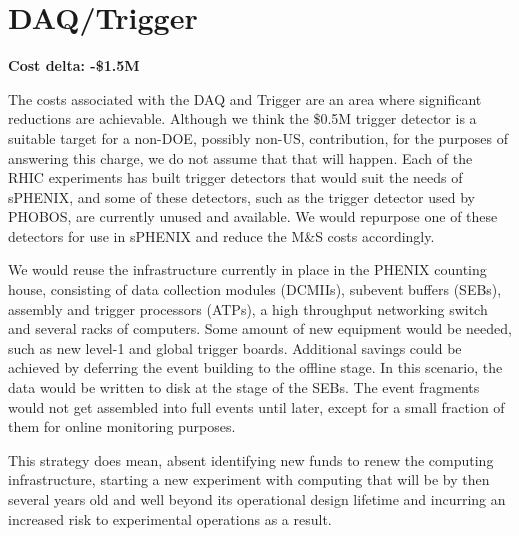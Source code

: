 \section{DAQ/Trigger}
\label{daq}

\textbf{Cost delta: -\$1.5M}

The costs associated with the DAQ and Trigger are an area where
significant reductions are achievable.  Although we think the
\$0.5M trigger detector is a suitable target for a non-DOE, possibly
non-US, contribution, for the purposes of answering this charge, we do
not assume that that will happen.  Each of the RHIC experiments has
built trigger detectors that would suit the needs of sPHENIX, and some
of these detectors, such as the trigger detector used by PHOBOS, are
currently unused and available.  We would repurpose one of these
detectors for use in sPHENIX and reduce the M\&S costs accordingly.

We would reuse the infrastructure currently in place in the PHENIX
counting house, consisting of data collection modules (DCMIIs),
subevent buffers (SEBs), assembly and trigger processors (ATPs), a
high throughput networking switch and several racks of computers.
Some amount of new equipment would be needed, such as new level-1 and
global trigger boards.  Additional savings could be achieved by
deferring the event building to the offline stage. In this scenario,
the data would be written to disk at the stage of the SEBs. The event
fragments would not get assembled into full events until later, except
for a small fraction of them for online monitoring purposes.

This strategy does mean, absent identifying new funds to renew the
computing infrastructure, starting a new experiment with computing
that will be by then several years old and well beyond its operational
design lifetime and incurring an increased risk to experimental
operations as a result.



